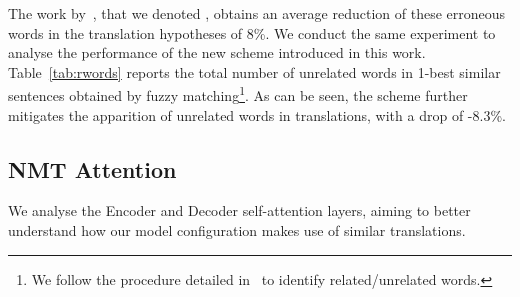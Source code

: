 The work by~\citet{xu20boosting}, that we denoted , obtains an average reduction of these erroneous words in the translation hypotheses of 8\%. We conduct the same experiment to analyse the performance of the new scheme  introduced in this work.
%
Table~\ref{tab:rwords} reports the total number of unrelated words in 1-best similar sentences obtained by fuzzy matching\footnote{We follow the procedure detailed in~\citet{xu20boosting} to identify related/unrelated words.}. As can be seen, the scheme  further mitigates the apparition of unrelated words in translations, with a drop of -8.3\%.

\begin{table}[h!]
\begin{center}

\end{center}
  \caption{Number of unrelated words appearing in test sets according to different augmentation schemes. The last row indicates the total number of unrelated words included in 1-best  similar sentences.}
  \label{tab:rwords}
\end{table}

\subsection*{NMT Attention}

We analyse the Encoder and Decoder self-attention layers, aiming to better understand how our  model configuration makes use of similar translations.

